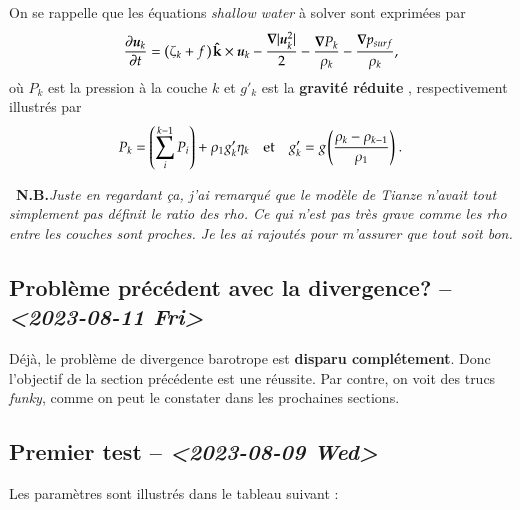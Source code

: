 \documentclass[10pt]{article}
\numberwithin{equation}{section}
\newcommand{\kvf}{\vb{\hat{k}}}
\newcommand{\uu}{\vb*{u}}
\newcommand{\pt}{\hspace{1pt}}
\newcommand{\nb}{\ding{165}\ \textbf{N.B.}\hspace{4pt}}
\begin{document}
On se rappelle que les équations \emph{shallow water} à solver sont exprimées par
\begin{equation}
   \pdv{\uu_k}{t} = \qty(\zeta_k + f\pt) \pt \kvf\times\uu_k -\frac{\gradient|\uu_k^2|}{2}  -\frac{\gradient{P_k}}{\rho_k} - \frac{\gradient p_{surf}}{\rho_k},
\end{equation}
où \(P_k\) est la pression à la couche \(k\) et \(g'_k\) est la  \textbf{gravité réduite} , respectivement illustrés par 
\begin{align}
   && P_k = \qty(\sum_i^{k-1} P_i ) + \rho_1 g'_k \eta_k &&  \text{et} && g'_k = g \pt\qty(\frac{\rho_k - \rho_{k-1}}{\rho_1})\ . &&
\end{align}

\nb \emph{Juste en regardant ça, j'ai remarqué que le modèle de Tianze n'avait tout simplement pas définit le ratio des rho. Ce qui n'est pas très grave comme les rho entre les couches sont proches. Je les ai rajoutés pour m'assurer que tout soit bon.}\bigskip

\subsection{Problème précédent avec la divergence? -- \textit{<2023-08-11 Fri>}}
\label{sec:orge578c7c}
Déjà, le problème de divergence barotrope est \textbf{disparu complétement}.
Donc l'objectif de la section précédente est une réussite.
Par contre, on voit des trucs \emph{funky}, comme on peut le constater dans les prochaines sections.

\subsection{Premier test -- \textit{<2023-08-09 Wed>}}
\label{sec:orgcbc464e}

Les paramètres sont illustrés dans le tableau suivant :
\end{document}
